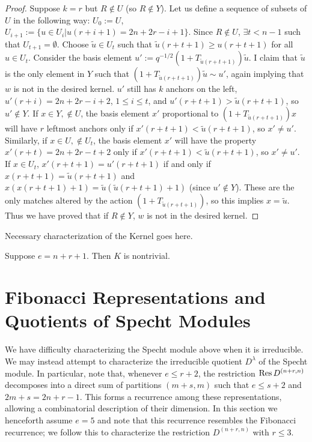 \documentclass{amsart}
\begin{document}
\begin{proof}
	Suppose $k=r$ but $R\not\in U$ (so $R\not\in Y$). Let us define a sequence of subsets of $U$ in the following way: $U_0:=U$, $U_{i+1}:=\{u\in U_i| u(r+i+1)=2n+2r-i+1 \}$. Since $R\not\in U$, $\exists t<n-1$ such that $U_{t+1}=\emptyset$. Choose $\tilde{u}\in U_t$ such that $\tilde{u}(r+t+1)\geq u(r+t+1)$ for all $u\in U_t$. Consider the basis element $u':=q^{-1/2}(1+T_{\tilde{u}(r+t+1)})\tilde{u}$. I claim that $\tilde{u}$ is the only element in $Y$ such that $(1+T_{\tilde{u}(r+t+1)})\tilde{u}\sim u'$, again implying that $w$ is not in the desired kernel. $u'$ still has $k$ anchors on the left, $u'(r+i)=2n+2r-i+2$, $1\leq i\leq t$, and $u'(r+t+1)>\tilde{u}(r+t+1)$, so $u'\not\in Y$. If $x\in Y,\not\in U$,  the basis element $x'$ proportional to $(1+T_{\tilde{u}(r+t+1)})x$ will have $r$ leftmost anchors only if $x'(r+t+1)<\tilde{u}(r+t+1)$, so $x'\not=u'$. Similarly, if $x\in U,\not\in U_t$, the basis element $x'$ will have the property $x'(r+t)=2n+2r-t+2$ only if $x'(r+t+1)<\tilde{u}(r+t+1)$, so $x'\not=u'$. If $x\in U_t$, $x'(r+t+1)=u'(r+t+1)$ if and only if $x(r+t+1)=\tilde{u}(r+t+1)$ and $x(x(r+t+1)+1)=\tilde{u}(\tilde{u}(r+t+1)+1)$ (since $u'\not \in Y$). These are the only matches altered by the action $(1+T_{\tilde{u}(r+t+1)})$, so this implies $x=\tilde{u}$. Thus we have proved that if $R\not\in Y$, $w$ is not in the desired kernel.
\end{proof}

{\color{orange} Necessary characterization of the Kernel goes here.}

\begin{proposition}
  Suppose $e = n + r + 1$.
  Then $K$ is nontrivial.
\end{proposition}

\section{Fibonacci Representations and Quotients of Specht Modules}\label{Fibonacci Section}
We have difficulty characterizing the Specht module above when it is irreducible.
We may instead attempt to characterize the irreducible quotient $D^\lambda$ of the Specht module.
In particular, note that, whenever $e \leq r + 2$, the restriction $\operatorname{Res} D^{(n+r,n)}$ decomposes into a direct sum of partitions $(m+s,m)$ such that $e \leq s + 2$ and $2m + s = 2n + r - 1$.
This forms a recurrence among these representations, allowing a combinatorial description of their dimension.
In this section we henceforth assume $e = 5$ and note that this recurrence resembles the Fibonacci recurrence;
we follow this to characterize the restriction $D^{(n+r,n)}$ with $r \leq 3$.
\end{document}
